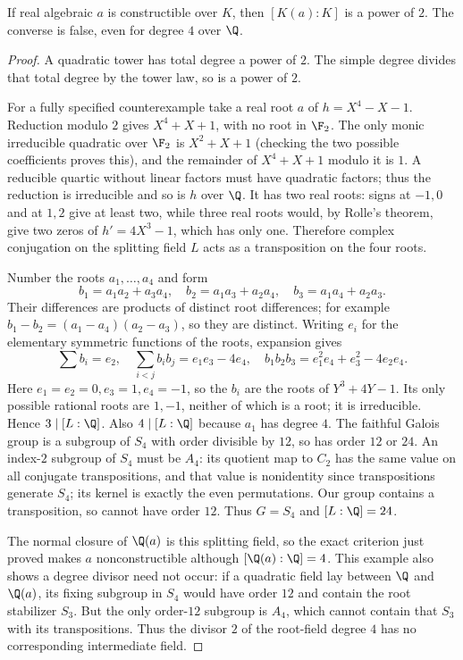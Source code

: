 \begin{theorem}
If real algebraic $a$ is constructible over $K$, then $[K(a):K]$ is a power of $2$. The converse is false, even for degree $4$ over $\Q$.
\end{theorem}
\begin{proof}
A quadratic tower has total degree a power of $2$. The simple degree divides that total degree by the tower law, so is a power of $2$.

For a fully specified counterexample take a real root $a$ of $h=X^4-X-1$. Reduction modulo $2$ gives $X^4+X+1$, with no root in $\F_2$. The only monic irreducible quadratic over $\F_2$ is $X^2+X+1$ (checking the two possible coefficients proves this), and the remainder of $X^4+X+1$ modulo it is $1$. A reducible quartic without linear factors must have quadratic factors; thus the reduction is irreducible and so is $h$ over $\Q$. It has two real roots: signs at $-1,0$ and at $1,2$ give at least two, while three real roots would, by Rolle's theorem, give two zeros of $h'=4X^3-1$, which has only one. Therefore complex conjugation on the splitting field $L$ acts as a transposition on the four roots.

Number the roots $a_1,\ldots,a_4$ and form
\[b_1=a_1a_2+a_3a_4,\quad b_2=a_1a_3+a_2a_4,\quad b_3=a_1a_4+a_2a_3.
\]
Their differences are products of distinct root differences; for example $b_1-b_2=(a_1-a_4)(a_2-a_3)$, so they are distinct. Writing $e_i$ for the elementary symmetric functions of the roots, expansion gives
\[\sum b_i=e_2,\quad\sum_{i<j}b_i b_j=e_1e_3-4e_4,\quad
 b_1b_2b_3=e_1^2e_4+e_3^2-4e_2e_4.
\]
Here $e_1=e_2=0,e_3=1,e_4=-1$, so the $b_i$ are the roots of $Y^3+4Y-1$. Its only possible rational roots are $1,-1$, neither of which is a root; it is irreducible. Hence $3\mid[L:\Q]$. Also $4\mid[L:\Q]$ because $a_1$ has degree $4$. The faithful Galois group is a subgroup of $S_4$ with order divisible by $12$, so has order $12$ or $24$. An index-$2$ subgroup of $S_4$ must be $A_4$: its quotient map to $C_2$ has the same value on all conjugate transpositions, and that value is nonidentity since transpositions generate $S_4$; its kernel is exactly the even permutations. Our group contains a transposition, so cannot have order $12$. Thus $G=S_4$ and $[L:\Q]=24$.

The normal closure of $\Q(a)$ is this splitting field, so the exact criterion just proved makes $a$ nonconstructible although $[\Q(a):\Q]=4$. This example also shows a degree divisor need not occur: if a quadratic field lay between $\Q$ and $\Q(a)$, its fixing subgroup in $S_4$ would have order $12$ and contain the root stabilizer $S_3$. But the only order-$12$ subgroup is $A_4$, which cannot contain that $S_3$ with its transpositions. Thus the divisor $2$ of the root-field degree $4$ has no corresponding intermediate field.
\end{proof}
